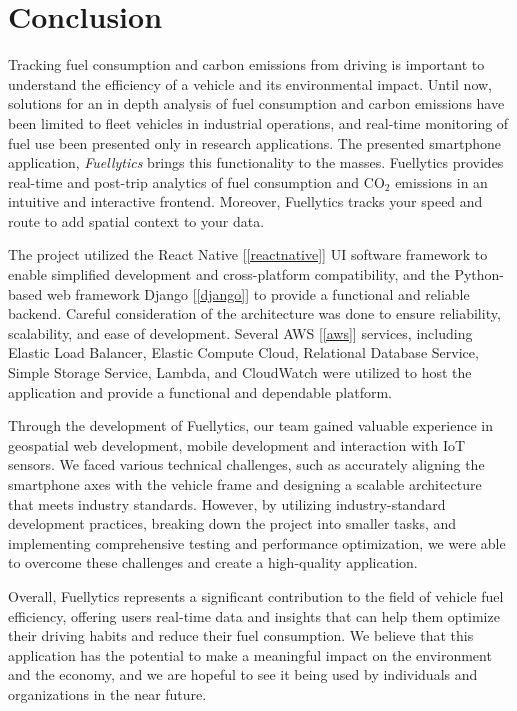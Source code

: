 \documentclass[11pt, oneside]{article}
\begin{document}
\section{Conclusion}
Tracking fuel consumption and carbon emissions from driving is important to understand the efficiency of a vehicle and its environmental impact.  Until now, solutions for an in depth analysis of fuel consumption and carbon emissions have been limited to fleet vehicles in industrial operations, and real-time monitoring of fuel use been presented only in research applications.  The presented smartphone application, \textit{Fuellytics} brings this functionality to the masses.  Fuellytics provides real-time and post-trip analytics of fuel consumption and CO$_2$ emissions in an intuitive and interactive frontend. Moreover, Fuellytics tracks your speed and route to add spatial context to your data.

The project utilized the React Native [\ref*{reactnative}] UI software framework to enable simplified development and cross-platform compatibility, and the Python-based web framework Django [\ref*{django}] to provide a functional and reliable backend.  Careful consideration of the architecture was done to ensure reliability, scalability, and ease of development. Several AWS [\ref*{aws}] services, including Elastic Load Balancer, Elastic Compute Cloud, Relational Database Service, Simple Storage Service, Lambda, and CloudWatch were utilized to host the application and provide a functional and dependable platform.

Through the development of Fuellytics, our team gained valuable experience in geospatial web development, mobile development and interaction with IoT sensors.  We faced various technical challenges, such as accurately aligning the smartphone axes with the vehicle frame and designing a scalable architecture that meets industry standards. However, by utilizing industry-standard development practices, breaking down the project into smaller tasks, and implementing comprehensive testing and performance optimization, we were able to overcome these challenges and create a high-quality application.

Overall, Fuellytics represents a significant contribution to the field of vehicle fuel efficiency, offering users real-time data and insights that can help them optimize their driving habits and reduce their fuel consumption. We believe that this application has the potential to make a meaningful impact on the environment and the economy, and we are hopeful to see it being used by individuals and organizations in the near future.
\end{document}
